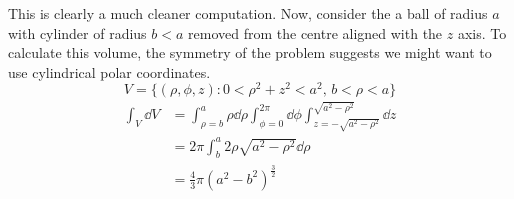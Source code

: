 This is clearly a much cleaner computation.
Now, consider the a ball of radius \(a\) with cylinder of radius \(b<a\) removed from the centre aligned with the \(z\) axis.
To calculate this volume, the symmetry of the problem suggests we might want to use cylindrical polar coordinates.
\[
	V = \{ (\rho, \phi, z) \colon 0 < \rho^2 + z^2 < a^2,\, b < \rho < a \}
\]
\begin{align*}
	\int_V \dd{V} & = \int_{\rho=b}^a \rho\dd{\rho} \int_{\phi=0}^{2\pi} \dd{\phi} \int_{z=-\sqrt{a^2 - \rho^2}}^{\sqrt{a^2 - \rho^2}} \dd{z} \\
	              & = 2 \pi \int_b^a 2\rho\sqrt{a^2 - \rho^2}\dd{\rho}                                                                        \\
	              & = \frac{4}{3}\pi (a^2 - b^2)^{\frac{3}{2}}
\end{align*}
